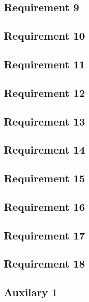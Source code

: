 \documentclass[a4paper]{article}
\begin{document}
    \subsection{Requirement 9}
    

    \subsection{Requirement 10}
    

    \subsection{Requirement 11}
    

    \subsection{Requirement 12}
    

    \subsection{Requirement 13}
    

    \subsection{Requirement 14}
    

    \subsection{Requirement 15}
    

    \subsection{Requirement 16}
    

    \subsection{Requirement 17}
    

    \subsection{Requirement 18}
    
    
    \subsection{Auxilary 1}
    
\end{document}

